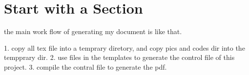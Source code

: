 
\section{Start with a Section}

the main work flow of generating my document is like that.

1. copy all tex file into a temprary diretory, and copy pics and codes dir into the tempprary dir.
2. use files in the templates to generate the control file of this project.
3. compile the contral file to generate the pdf.

\putbib[sample]             %
